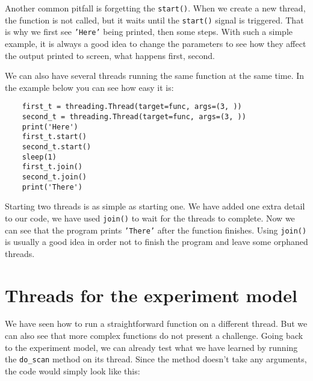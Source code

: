 Another common pitfall is forgetting the \texttt{start()}. When we create a new thread, the function is not called, but it waits until the \texttt{start()} signal is triggered. That is why we first see \texttt{'Here'} being printed, then some steps. With such a simple example, it is always a good idea to change the parameters to see how they affect the output printed to screen, what happens first, second.

We can also have several threads running the same function at the same time. In the example below you can see how easy it is:

\begin{verbatim}
    first_t = threading.Thread(target=func, args=(3, ))
    second_t = threading.Thread(target=func, args=(3, ))
    print('Here')
    first_t.start()
    second_t.start()
    sleep(1)
    first_t.join()
    second_t.join()
    print('There')
\end{verbatim}

Starting two threads is as simple as starting one. We have added one extra detail to our code, we have used \texttt{join()} to wait for the threads to complete. Now we can see that the program prints \texttt{'There'} after the function finishes. Using \texttt{join()} is usually a good idea in order not to finish the program and leave some orphaned threads.


\section{Threads for the experiment model}\label{section:threads-experiment-model}
We have seen how to run a straightforward function on a different thread. But we can also see that more complex functions do not present a challenge. Going back to the experiment model, we can already test what we have learned by running the \texttt{do\_scan} method on its thread. Since the method doesn't take any arguments, the code would simply look like this:

